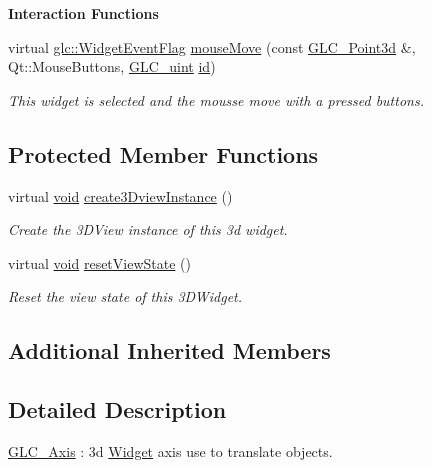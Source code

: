 \begin{Indent}{\bf Interaction Functions}
\begin{DoxyCompactItemize}
virtual \hyperlink{namespaceglc_a7a4a1e3955352aeb2d018746fbe626d5}{glc\-::\-Widget\-Event\-Flag} \hyperlink{class_g_l_c___axis_a3f770cb625647af830ae89e0a4cbef27}{mouse\-Move} (const \hyperlink{glc__vector3d_8h_a4e13a9bbc7ab3d34de7e98b41836772c}{G\-L\-C\-\_\-\-Point3d} \&, Qt\-::\-Mouse\-Buttons, \hyperlink{glc__global_8h_abf950976fabed69026558df8e2da6c6b}{G\-L\-C\-\_\-uint} \hyperlink{glext_8h_a58c2a664503e14ffb8f21012aabff3e9}{id})
\begin{DoxyCompactList}\small\item\em This widget is selected and the mousse move with a pressed buttons. \end{DoxyCompactList}\end{DoxyCompactItemize}
\end{Indent}
\subsection*{Protected Member Functions}
\begin{DoxyCompactItemize}
\item 
virtual \hyperlink{group___u_a_v_objects_plugin_ga444cf2ff3f0ecbe028adce838d373f5c}{void} \hyperlink{class_g_l_c___axis_ad227e569fa573af321731d381ce3b3de}{create3\-Dview\-Instance} ()
\begin{DoxyCompactList}\small\item\em Create the 3\-D\-View instance of this 3d widget. \end{DoxyCompactList}\item 
virtual \hyperlink{group___u_a_v_objects_plugin_ga444cf2ff3f0ecbe028adce838d373f5c}{void} \hyperlink{class_g_l_c___axis_a16370b593711d53cb94dfcaf1439c8ee}{reset\-View\-State} ()
\begin{DoxyCompactList}\small\item\em Reset the view state of this 3\-D\-Widget. \end{DoxyCompactList}\end{DoxyCompactItemize}
\subsection*{Additional Inherited Members}


\subsection{Detailed Description}
\hyperlink{class_g_l_c___axis}{G\-L\-C\-\_\-\-Axis} \-: 3d \hyperlink{class_widget}{Widget} axis use to translate objects. 

